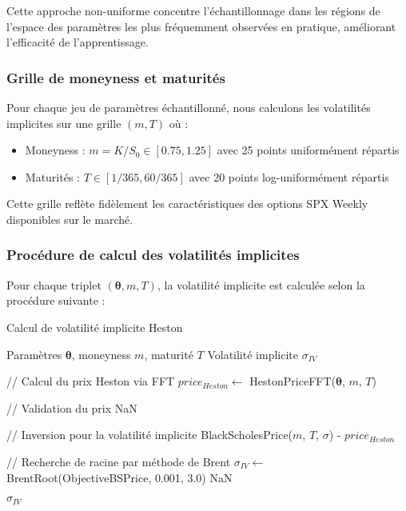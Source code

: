Cette approche non-uniforme concentre l'échantillonnage dans les régions de l'espace des paramètres les plus fréquemment observées en pratique, améliorant l'efficacité de l'apprentissage.

\subsubsection{Grille de moneyness et maturités}

Pour chaque jeu de paramètres échantillonné, nous calculons les volatilités implicites sur une grille $(m, T)$ où :
\begin{itemize}
\item Moneyness : $m = K/S_0 \in [0.75, 1.25]$ avec 25 points uniformément répartis
\item Maturités : $T \in [1/365, 60/365]$ avec 20 points log-uniformément répartis
\end{itemize}

Cette grille reflète fidèlement les caractéristiques des options SPX Weekly disponibles sur le marché.

\subsubsection{Procédure de calcul des volatilités implicites}

Pour chaque triplet $(\boldsymbol{\theta}, m, T)$, la volatilité implicite est calculée selon la procédure suivante :

\begin{algorithm}[H]
\caption{Calcul de volatilité implicite Heston}
\begin{algorithmic}
\REQUIRE Paramètres $\boldsymbol{\theta}$, moneyness $m$, maturité $T$
\ENSURE Volatilité implicite $\sigma_{IV}$

\STATE // Calcul du prix Heston via FFT
\STATE $price_{Heston} \leftarrow$ HestonPriceFFT($\boldsymbol{\theta}$, $m$, $T$)

\STATE // Validation du prix
    \RETURN NaN
\ENDIF

\STATE // Inversion pour la volatilité implicite
    \RETURN BlackScholesPrice($m$, $T$, $\sigma$) - $price_{Heston}$
\ENDFUNCTION

\STATE // Recherche de racine par méthode de Brent
\TRY
    \STATE $\sigma_{IV} \leftarrow$ BrentRoot(ObjectiveBSPrice, 0.001, 3.0)
\CATCH
    \RETURN NaN
\ENDTRY

\RETURN $\sigma_{IV}$
\end{algorithmic}
\end{algorithm}

